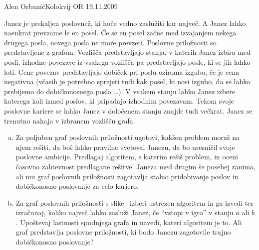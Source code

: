 \begin{naloga}{Alen Orbanić}{Kolokvij OR 19.11.2009}
\begin{vprasanje}
Janez je prekaljen poslovnež, ki hoče vedno zaslužiti kar največ.
A Janez lahko naenkrat prevzame le en posel.
Če se en posel začne med izvajanjem nekega drugega posla,
novega posla ne more prevzeti.
Poslovne priložnosti so predstavljene z grafom.
Vozlišča predstavljajo stanja, v katerih Janez izbira med posli,
izhodne povezave iz vsakega vozlišča pa predstavljajo posle,
ki se jih lahko loti.
Cene povezav predstavljajo dobiček pri poslu oziroma izgubo,
če je cena negativna
(včasih je potrebno sprejeti tudi kak posel, ki nosi izgubo,
da se lahko prebijemo do dobičkonosnega posla \dots).
V vsakem stanju lahko Janez izbere katerega koli izmed poslov,
ki pripadajo izhodnim povezavam.
Tekom svoje poslovne kariere se lahko Janez
v določenem stanju znajde tudi večkrat.
Janez se trenutno nahaja v izbranem vozlišču grafa.
\begin{enumerate}[(a)]
\item Za poljuben graf poslovnih priložnosti ugotovi,
kakšen problem moraš na njem rešiti, da boš lahko pravilno svetoval Janezu,
da bo uresničil svoje poslovne ambicije.
Predlagaj algoritem, s katerim rešiš problem,
in oceni časovno zahtevnost predlagane rešitve.
Janeza med drugim še posebej zanima,
ali mu graf poslovnih priložnosti zagotavlja stalno pridobivanje poslov
in dobičkonosno poslovanje za celo kariero.
\item Za graf poslovnih priložnosti s slike~\fig
izberi ustrezen algoritem in ga izvedi ter izračunaj,
koliko največ lahko zasluži Janez, če ``vstopi v igro'' v stanju $a$ ali $b$.
Upoštevaj lastnosti spodnjega grafa in navedi, kateri algoritem je to.
Ali graf predstavlja poslovne priložnosti,
ki bodo Janezu zagotovile trajno dobičkonosno poslovanje?
\end{enumerate}


\end{vprasanje}
\end{naloga}
